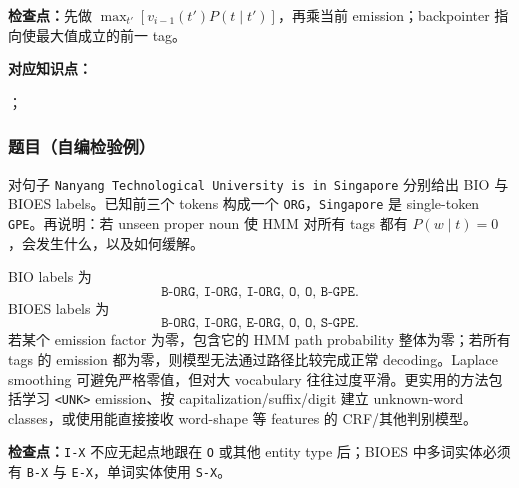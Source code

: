 \textbf{检查点：}先做 $\max_{t'}[v_{i-1}(t')P(t\mid t')]$，再乘当前 emission；backpointer 指向使最大值成立的前一 tag。


\textbf{对应知识点：}\par
{}；\par
{}

\subsubsection*{题目（自编检验例）}

对句子 \texttt{Nanyang Technological University is in Singapore} 分别给出 BIO 与 BIOES labels。已知前三个 tokens 构成一个 \texttt{ORG}，\texttt{Singapore} 是 single-token \texttt{GPE}。再说明：若 unseen proper noun 使 HMM 对所有 tags 都有 $P(w\mid t)=0$，会发生什么，以及如何缓解。

\begin{workedsolution}
BIO labels 为
\[
  \boxed{\texttt{B-ORG, I-ORG, I-ORG, O, O, B-GPE}}.
\]
BIOES labels 为
\[
  \boxed{\texttt{B-ORG, I-ORG, E-ORG, O, O, S-GPE}}.
\]
若某个 emission factor 为零，包含它的 HMM path probability 整体为零；若所有 tags 的 emission 都为零，则模型无法通过路径比较完成正常 decoding。Laplace smoothing 可避免严格零值，但对大 vocabulary 往往过度平滑。更实用的方法包括学习 \texttt{<UNK>} emission、按 capitalization/suffix/digit 建立 unknown-word classes，或使用能直接接收 word-shape 等 features 的 CRF/其他判别模型。
\end{workedsolution}

\textbf{检查点：}\texttt{I-X} 不应无起点地跟在 \texttt{O} 或其他 entity type 后；BIOES 中多词实体必须有 \texttt{B-X} 与 \texttt{E-X}，单词实体使用 \texttt{S-X}。
